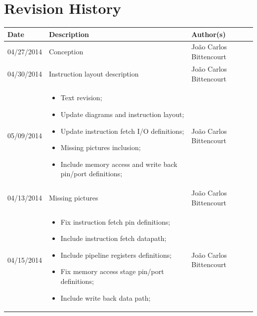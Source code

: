 \documentclass{article}
\begin{document}
  \section*{\center Revision History}
  \vspace*{1cm}
  \begin{table}[ht] %
  \centering
  \begin{tabular}[pos]{|m{2cm} | m{7.2cm} | m{3.8cm}|} 
  \hline %
  \cellcolor[gray]{0.9}
  \textbf{Date} & \cellcolor[gray]{0.9}\textbf{Description} & \cellcolor[gray]{0.9}\textbf{Author(s)}\\ \hline
  \hline
  \small 04/27/2014 & \small Conception & \small João Carlos Bittencourt \\ \hline
  \small 04/30/2014 & \small Instruction layout description & \small João Carlos Bittencourt \\ \hline
  \small 05/09/2014 & 
  \begin{small}
    \begin{itemize}
      \item Text revision;
      \item Update diagrams and instruction layout;
      \item Update instruction fetch I/O definitions;
      \item Missing pictures inclusion;
      \item Include memory access and write back pin/port definitions;
    \end{itemize}
  \end{small} & \small João Carlos Bittencourt \\ \hline
  \small 04/13/2014 & \small Missing pictures & \small João Carlos Bittencourt \\ \hline
  \small 04/15/2014 & \small   \begin{small}
    \begin{itemize}
      \item Fix instruction fetch pin definitions;
      \item Include instruction fetch datapath;
      \item Include pipeline registers definitions;
      \item Fix memory access stage pin/port definitions;
      \item Include write back data path;
    \end{itemize}
  \end{small} & \small João Carlos Bittencourt \\ \hline

\end{tabular}
\end{table}
\end{document}

